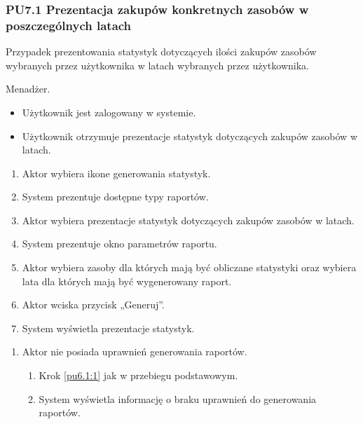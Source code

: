 \subsubsection{PU7.1 Prezentacja zakupów konkretnych zasobów w poszczególnych latach}
Przypadek prezentowania statystyk dotyczących ilości zakupów zasobów wybranych przez użytkownika w latach wybranych przez użytkownika.

Menadżer.

\begin{itemize}
\item Użytkownik jest zalogowany w systemie.
\end{itemize}

\begin{itemize}
\item Użytkownik otrzymuje prezentacje statystyk dotyczących zakupów zasobów w latach.
\end{itemize}

\begin{enumerate}
	\item \label{pu7.1:1} Aktor wybiera ikone generowania statystyk.
	\item System prezentuje dostępne typy raportów.
	\item \label{pu7.2:2} Aktor wybiera prezentacje statystyk dotyczących zakupów zasobów w latach.
	\item System prezentuje okno parametrów raportu.
	\item Aktor wybiera zasoby dla których mają być obliczane statystyki oraz wybiera lata dla których mają być wygenerowany raport.
	\item Aktor wciska przycisk „Generuj”.
	\item System wyświetla prezentacje statystyk.
\end{enumerate}

\begin{enumerate}
	\item Aktor nie posiada uprawnień generowania raportów.
	\begin{enumerate}[label*=\arabic*.]
		\item Krok \ref{pu6.1:1} jak w przebiegu podstawowym.
		\item System wyświetla informację o braku uprawnień do generowania raportów.
	\end{enumerate}
\end{enumerate}

